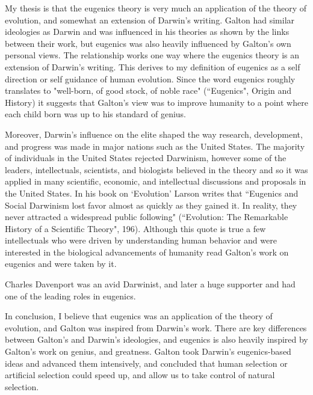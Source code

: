 \documentclass[11pt, oneside]{article}
\begin{document}
\par My thesis is that the eugenics theory is very much an application of the theory of evolution, and somewhat an extension of Darwin's writing. Galton had similar ideologies as Darwin and was influenced in his theories as shown by the links between their work, but eugenics was also heavily influenced by Galton's own personal views. The relationship works one way where the eugenics theory is an extension of Darwin's writing. This derives to my definition of eugenics as a self direction or self guidance of human evolution. Since the word eugenics roughly translates to "well-born, of good stock, of noble race" (``Eugenics", Origin and History) it suggests that Galton's view was to improve humanity to a point where each child born was up to his standard of genius. 

\par Moreover, Darwin's influence on the elite shaped the way research, development, and progress was made in major nations such as the United States. The majority of individuals in the United States rejected Darwinism, however some of the leaders, intellectuals, scientists, and biologists believed in the theory and so it was applied in many scientific, economic, and intellectual discussions and proposals in the United States. In his book on `Evolution' Larson writes that ``Eugenics and Social Darwinism lost favor almost as quickly as they gained it. In reality, they never attracted a widespread public following" (``Evolution: The Remarkable History of a Scientific Theory", 196). Although this quote is true a few intellectuals who were driven by understanding human behavior and were interested in the biological advancements of humanity read Galton's work on eugenics and were taken by it.
\par Charles Davenport was an avid Darwinist, and later a huge supporter and had one of the leading roles in eugenics. 

\par In conclusion, I believe that eugenics was an application of the theory of evolution, and Galton was inspired from Darwin's work. There are key differences between Galton's and Darwin's ideologies, and eugenics is also heavily inspired by Galton's work on genius, and greatness. Galton took Darwin's eugenics-based ideas and advanced them intensively, and concluded that human selection or artificial selection could speed up, and allow us to take control of natural selection. 
\end{document}
